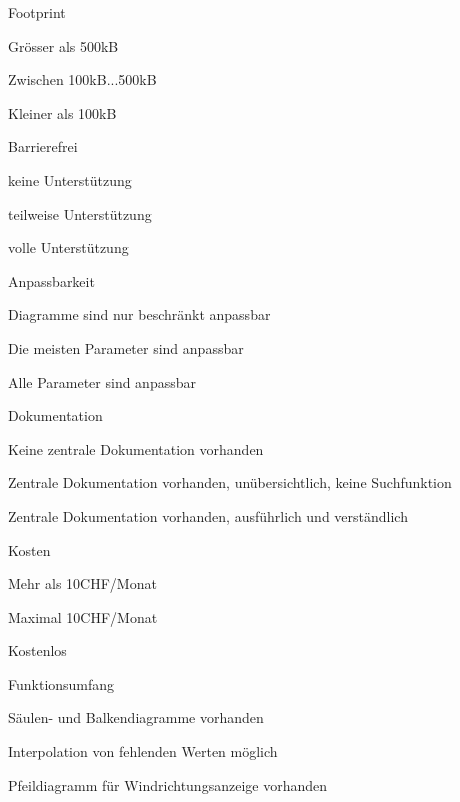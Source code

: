 \begin{itemize*}
\item Footprint
  \begin{enumerate*}
  \item Grösser als 500kB
  \item Zwischen 100kB...500kB
  \item Kleiner als 100kB
  \end{enumerate*}
\item Barrierefrei
  \begin{enumerate*}
  \item keine Unterstützung
  \item teilweise Unterstützung
  \item volle Unterstützung
  \end{enumerate*}
\item Anpassbarkeit
  \begin{enumerate*}
  \item Diagramme sind nur beschränkt anpassbar
  \item Die meisten Parameter sind anpassbar
  \item Alle Parameter sind anpassbar
  \end{enumerate*}
\item Dokumentation
  \begin{enumerate*}
  \item Keine zentrale Dokumentation vorhanden
  \item Zentrale Dokumentation vorhanden, unübersichtlich, keine Suchfunktion
  \item Zentrale Dokumentation vorhanden, ausführlich und verständlich
  \end{enumerate*}
\item Kosten
  \begin{enumerate*}
  \item Mehr als 10CHF/Monat
  \item Maximal 10CHF/Monat
  \item Kostenlos
  \end{enumerate*}
\item Funktionsumfang
  \begin{enumerate*}
  \item Säulen- und Balkendiagramme vorhanden
  \item Interpolation von fehlenden Werten möglich
  \item Pfeildiagramm für Windrichtungsanzeige vorhanden
  \end{enumerate*}
\end{itemize*}



